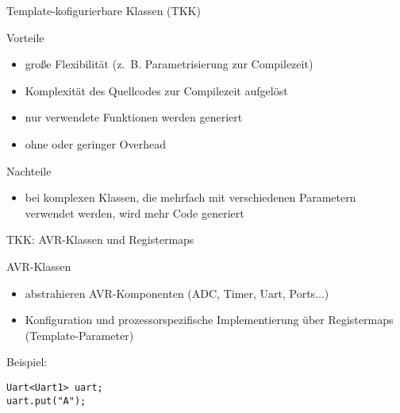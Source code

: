 \documentclass[11pt]{beamer}
\begin{document}
\begin{frame}[fragile]{Template-kofigurierbare Klassen (TKK)}

\begin{block}{Vorteile}
\begin{itemize}
	\item große Flexibilität (z.~B. Parametrisierung zur Compilezeit)
	\item Komplexität des Quellcodes zur Compilezeit aufgelöst
	\item nur verwendete Funktionen werden generiert
	\item ohne oder geringer Overhead 
\end{itemize}
\end{block}

\begin{block}{Nachteile}
\begin{itemize}
\item bei komplexen Klassen, die mehrfach mit verschiedenen Parametern verwendet werden, wird mehr Code generiert
\end{itemize}
\end{block}

% 
\end{frame}



\begin{frame}[fragile]{TKK: AVR-Klassen und Registermaps}
	\begin{block}{AVR-Klassen}
		\begin{itemize}
			\item abstrahieren AVR-Komponenten (ADC, Timer, Uart, Ports...)
			\item Konfiguration und prozessorspezifische Implementierung über Registermaps (Template-Parameter)
		\end{itemize}
	\end{block}
\begin{block}{Beispiel:}
\begin{lstlisting}
Uart<Uart1> uart;
uart.put("A");
\end{lstlisting}
\end{block}


\end{frame}
\end{document}
